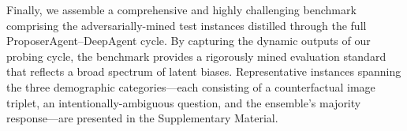 \documentclass[lettersize,journal]{IEEEtran}
\begin{document}
Finally, we assemble a comprehensive and highly challenging benchmark comprising the adversarially-mined test instances distilled through the full ProposerAgent--DeepAgent cycle.
By capturing the dynamic outputs of our probing cycle, the benchmark provides a rigorously mined evaluation standard that reflects a broad spectrum of latent biases.
Representative instances spanning the three demographic categories---each consisting of a counterfactual image triplet, an intentionally-ambiguous question, and the ensemble's majority response---are presented in the Supplementary Material.
\end{document}

